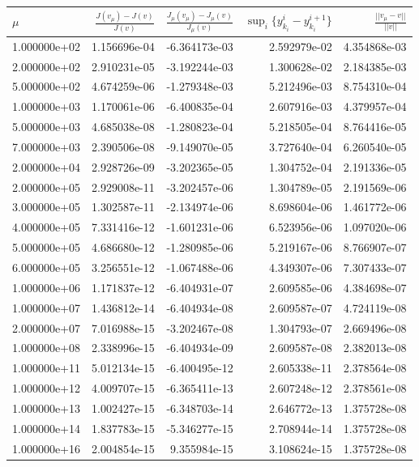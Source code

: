 \begin{tabular}{lrrrr}
\toprule 
{} $\mu$&  $\frac{J(v_{\mu})-J(v)}{J(v)}$ &  $\frac{J_{\mu}(v_{\mu})-J_{\mu}(v)}{J_{\mu}(v)}$ &         $\sup_i\{y_{k_i}^i-y_{k_i}^{i+1}\}$ &    $\frac{||v_{\mu}-v||}{||v||}$ \\
\midrule
1.000000e+02 &      1.156696e-04 &            -6.364173e-03 &  2.592979e-02 &  4.354868e-03 \\
2.000000e+02 &      2.910231e-05 &            -3.192244e-03 &  1.300628e-02 &  2.184385e-03 \\
5.000000e+02 &      4.674259e-06 &            -1.279348e-03 &  5.212496e-03 &  8.754310e-04 \\
1.000000e+03 &      1.170061e-06 &            -6.400835e-04 &  2.607916e-03 &  4.379957e-04 \\
5.000000e+03 &      4.685038e-08 &            -1.280823e-04 &  5.218505e-04 &  8.764416e-05 \\
7.000000e+03 &      2.390506e-08 &            -9.149070e-05 &  3.727640e-04 &  6.260540e-05 \\
2.000000e+04 &      2.928726e-09 &            -3.202365e-05 &  1.304752e-04 &  2.191336e-05 \\
2.000000e+05 &      2.929008e-11 &            -3.202457e-06 &  1.304789e-05 &  2.191569e-06 \\
3.000000e+05 &      1.302587e-11 &            -2.134974e-06 &  8.698604e-06 &  1.461772e-06 \\
4.000000e+05 &      7.331416e-12 &            -1.601231e-06 &  6.523956e-06 &  1.097020e-06 \\
5.000000e+05 &      4.686680e-12 &            -1.280985e-06 &  5.219167e-06 &  8.766907e-07 \\
6.000000e+05 &      3.256551e-12 &            -1.067488e-06 &  4.349307e-06 &  7.307433e-07 \\
1.000000e+06 &      1.171837e-12 &            -6.404931e-07 &  2.609585e-06 &  4.384698e-07 \\
1.000000e+07 &      1.436812e-14 &            -6.404934e-08 &  2.609587e-07 &  4.724119e-08 \\
2.000000e+07 &      7.016988e-15 &            -3.202467e-08 &  1.304793e-07 &  2.669496e-08 \\
1.000000e+08 &      2.338996e-15 &            -6.404934e-09 &  2.609587e-08 &  2.382013e-08 \\
1.000000e+11 &      5.012134e-15 &            -6.400495e-12 &  2.605338e-11 &  2.378564e-08 \\
1.000000e+12 &      4.009707e-15 &            -6.365411e-13 &  2.607248e-12 &  2.378561e-08 \\
1.000000e+13 &      1.002427e-15 &            -6.348703e-14 &  2.646772e-13 &  1.375728e-08 \\
1.000000e+14 &      1.837783e-15 &            -5.346277e-15 &  2.708944e-14 &  1.375728e-08 \\
1.000000e+16 &      2.004854e-15 &             9.355984e-15 &  3.108624e-15 &  1.375728e-08 \\
\bottomrule
\end{tabular}
